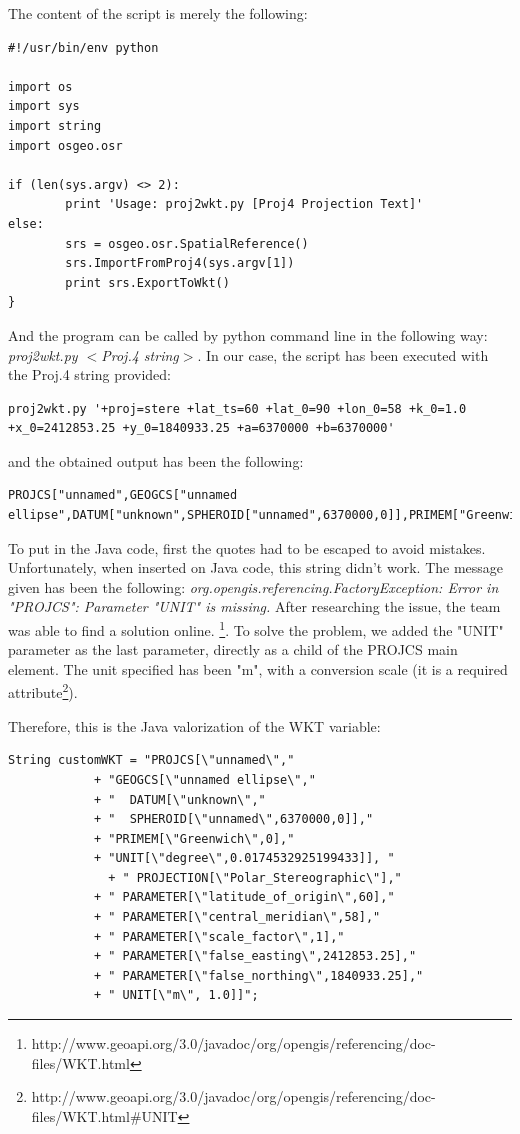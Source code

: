 \documentclass[11pt,a4paper,titlepage,oneside]{report}
\begin{document}
The content of the script is merely the following:

\begin{lstlisting}
#!/usr/bin/env python

import os
import sys
import string
import osgeo.osr

if (len(sys.argv) <> 2):
        print 'Usage: proj2wkt.py [Proj4 Projection Text]'
else:
        srs = osgeo.osr.SpatialReference()
        srs.ImportFromProj4(sys.argv[1])
        print srs.ExportToWkt()
}
\end{lstlisting}

And the program can be called by python command line in the following way:
\textit{proj2wkt.py $<$Proj.4 string$>$}. In our case, the script has been executed with the Proj.4 string provided:
\begin{lstlisting}
proj2wkt.py '+proj=stere +lat_ts=60 +lat_0=90 +lon_0=58 +k_0=1.0 +x_0=2412853.25 +y_0=1840933.25 +a=6370000 +b=6370000'
\end{lstlisting}

and the obtained output has been the following:
\begin{lstlisting}
PROJCS["unnamed",GEOGCS["unnamed ellipse",DATUM["unknown",SPHEROID["unnamed",6370000,0]],PRIMEM["Greenwich",0],UNIT["degree",0.0174532925199433]],PROJECTION["Polar_Stereographic"],PARAMETER["latitude_of_origin",60],PARAMETER["central_meridian",58],PARAMETER["scale_factor",1],PARAMETER["false_easting",2412853.25],PARAMETER["false_northing",1840933.25]]
\end{lstlisting}
To put in the Java code, first the quotes had to be escaped to avoid mistakes. 
Unfortunately, when inserted on Java code, this string didn't work. The message given has been the following: \textit{org.opengis.referencing.FactoryException: Error in "PROJCS": Parameter "UNIT" is missing.}
After researching the issue, the team was able to find a solution online. \footnote{http://www.geoapi.org/3.0/javadoc/org/opengis/referencing/doc-files/WKT.html}.
To solve the problem, we added the "UNIT" parameter as the last parameter, directly as a child of the PROJCS main element. The unit specified has been "m", with a conversion scale (it is a required attribute\footnote{http://www.geoapi.org/3.0/javadoc/org/opengis/referencing/doc-files/WKT.html\#UNIT}).

Therefore, this is the Java valorization of the WKT variable:
\begin{lstlisting}
String customWKT = "PROJCS[\"unnamed\","
            + "GEOGCS[\"unnamed ellipse\","
            + "  DATUM[\"unknown\","
            + "  SPHEROID[\"unnamed\",6370000,0]],"
            + "PRIMEM[\"Greenwich\",0],"
            + "UNIT[\"degree\",0.0174532925199433]], "
              + " PROJECTION[\"Polar_Stereographic\"],"
            + " PARAMETER[\"latitude_of_origin\",60],"
            + " PARAMETER[\"central_meridian\",58],"
            + " PARAMETER[\"scale_factor\",1],"
            + " PARAMETER[\"false_easting\",2412853.25],"
            + " PARAMETER[\"false_northing\",1840933.25],"
            + " UNIT[\"m\", 1.0]]";
\end{lstlisting}
\end{document}
